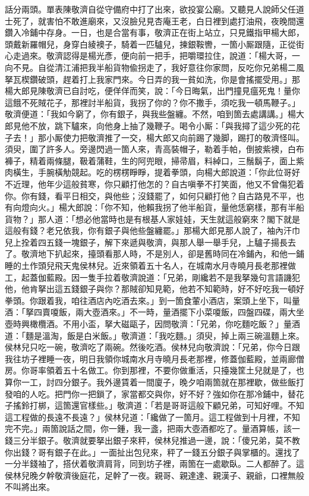 話分兩頭。單表陳敬濟自從守備府中打了出來，欲投宴公廟。又聽見人說師父任道士死了，就害怕不敢進廟來，又沒臉兒見杏庵王老，白日裡到處打油飛，夜晚間還鑽入冷鋪中存身。一日，也是合當有事，敬濟正在街上站立，只見鐵指甲楊大郎，頭戴新羅帽兒，身穿白綾襖子，騎着一匹驢兒，揀銀鞍轡，一箇小厮跟隨，正從街心走過來。敬濟認得是楊光彥，便向前一把手，把嚼環拉住，說道：「楊大哥，一向不見。自從清江浦把我半船貨物偸拐走了，我好意往你家問，反吃你兄弟楊二風拏瓦楔鑽破頭，趕着打上我家門來。今日弄的我一貧如洗，你是會搖擺受用。」那楊大郎見陳敬濟已自討吃，便佯佯而笑，說：「今日晦氣，出門撞見瘟死鬼！量你這餓不死賊花子，那裡討半船貨，我拐了你的？你不撒手，須吃我一頓馬鞭子。」敬濟便道：「我如今窮了，你有銀子，與我些盤纏。不然，咱到箇去處講講。」楊大郎見他不放，跳下驢來，向他身上抽了幾鞭子。喝令小厮：「與我撏了這少死的花子去！」那小厮使力把敬濟推了一交，楊大郎又向前踢了幾脚，踢打的敬濟怪叫。須臾，圍了許多人。旁邊閃過一箇人來，青高裝帽子，勒着手帕，倒披紫襖，白布褲子，精着兩條腿，靸着蒲鞋，生的阿兜眼，掃帚眉，料綽口，三鬚鬍子，面上紫肉橫生，手腕橫觔競起。吃的楞楞睜睜，提着拳頭，向楊大郎說道：「你此位哥好不近理，他年少這般貧寒，你只顧打他怎的？{}自古嗔拳不打笑面，他又不曾傷犯着你。你有錢，看平日相交，與他些；沒錢罷了，如何只顧打他？自古路見不平，也有向燈向火。」楊大郎說：「你不知，他賴我拐了他半船貨，量他恁窮樣，那有半船貨物？」那人道：「想必他當時也是有根基人家娃娃，天生就這般窮來？閣下就是這般有錢？老兄依我，你有銀子與他些盤纏罷。」那楊大郎見那人說了，袖內汗巾兒上拴着四五錢一塊銀子，解下來遞與敬濟，與那人舉一舉手兒，上驢子揚長去了。敬濟地下扒起來，擡頭看那人時，不是別人，卻是舊時同在冷鋪內，和他一鋪睡的土作頭兒飛天鬼侯林兒。近來領着五十名人，在城南水月寺曉月長老那裡做工，起蓋伽藍殿。因一隻手拉着敬濟說道：「兄弟，剛纔若不是我拏幾句言語譏犯他，他肯拏出這五錢銀子與你？那賊卻知見範，他若不知範時，好不好吃我一頓好拳頭。你跟着我，咱往酒店內吃酒去來。」到一箇食葷小酒店，案頭上坐下，叫量酒：「拏四賣嗄飯，兩大壺酒來。」不一時，量酒擺下小菜嗄飯，四盤四碟，兩大坐壺時興橄欖酒。不用小盃，拏大磁甌子，因問敬濟：「兄弟，你吃麵吃飯？」量酒道：「麵是溫淘，飯是白米飯。」敬濟道：「我吃麵。」須臾，掉上兩三碗溫麵上來。侯林兒只吃一碗，敬濟吃了兩碗。然後吃酒。侯林兒向敬濟說：「兄弟，你今日跟我往坊子裡睡一夜，{}明日我領你城南水月寺曉月長老那裡，修蓋伽藍殿，並兩廊僧房。你哥率領着五十名做工。你到那裡，不要你做重活，只擡幾筐土兒就是了，也算你一工，討四分銀子。我外邊賃着一間廈子，晚夕咱兩箇就在那裡歇，{}做些飯打發咱的人吃。把門你一把鎖了，家當都交與你，{}好不好？強如你在那冷鋪中，替花子搖鈴打梆，這箇還官樣些。」敬濟道：「若是哥哥這般下顧兄弟，可知好哩。不知這工程做的長遠不長遠？」侯林兒道：「纔做了一箇月。這工程做到十月裡，不知完不完。」兩箇說話之間，你一鍾，我一盞，把兩大壺酒都吃了。量酒算帳，該一錢三分半銀子。敬濟就要拏出銀子來秤，侯林兒推過一邊，說：「傻兄弟，莫不教你出錢？哥有銀子在此。」一面扯出包兒來，秤了一錢五分銀子與掌櫃的。還找了一分半錢袖了，搭伏着敬濟肩背，同到坊子裡，兩箇在一處歇臥。二人都醉了。這侯林兒晚夕幹敬濟後庭花，足幹了一夜。親哥、親達達、親漢子、親爺，口裡無般不叫將出來。

